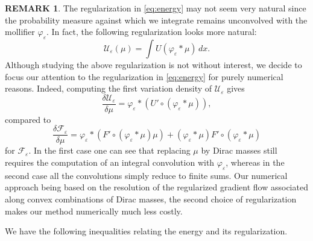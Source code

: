 \documentclass[11pt,leqno]{amsart}
\theoremstyle{definition}
\newtheorem{remark}[thm]{REMARK}
\newcommand{\bes}{\begin{equation*}}
\newcommand{\ees}{\end{equation*}}
\newcommand{\F}{\mathcal{F}}
\def\e{\varepsilon}
\def\F{\mathcal{F}}
\begin{document}
\begin{remark} \label{whyconvolution}
	The regularization in \eqref{eq:energy} may not seem very natural since the probability measure against which we integrate remains unconvolved with the mollifier $\varphi_\e$. In fact, the following regularization looks more natural:
\bes
	\mathcal{U}_\e(\mu) = \int U(\varphi_\e*\mu) \,dx.
\ees
Although studying the above regularization is not without interest, we decide to focus our attention to the regularization in \eqref{eq:energy} for purely numerical reasons. Indeed, computing the first variation density of $\mathcal{U}_\e$ gives
\bes
	\frac{\delta \mathcal{U}_\e}{\delta \mu} = \varphi_\e * (U' \circ (\varphi_\e*\mu)),
\ees
compared to 
\bes
	\frac{\delta \mathcal{F}_\e}{\delta \mu} = \varphi_\e * (F' \circ (\varphi_\e*\mu)\mu) + (\varphi_\e *\mu) F'\circ(\varphi_\e *\mu)
\ees
for $\F_\e$. In the first case one can see that replacing $\mu$ by Dirac masses still requires the computation of an integral convolution with $\varphi_\e$, whereas in the second case all the convolutions simply reduce to finite sums. Our numerical approach being based on the resolution of the regularized gradient flow associated along convex combinations of Dirac masses, the second choice of regularization makes our method numerically much less costly.
\end{remark}





We have the following inequalities relating the energy and its regularization.
\end{document}

